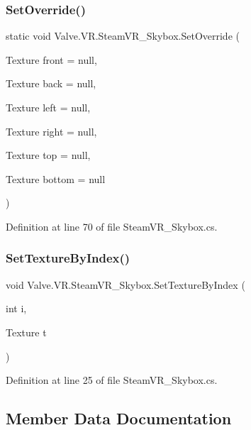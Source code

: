 \subsubsection{\texorpdfstring{SetOverride()}{SetOverride()}}
{\footnotesize\ttfamily static void Valve.\+V\+R.\+Steam\+V\+R\+\_\+\+Skybox.\+Set\+Override (\begin{DoxyParamCaption}\item[{Texture}]{front = {\ttfamily null},  }\item[{Texture}]{back = {\ttfamily null},  }\item[{Texture}]{left = {\ttfamily null},  }\item[{Texture}]{right = {\ttfamily null},  }\item[{Texture}]{top = {\ttfamily null},  }\item[{Texture}]{bottom = {\ttfamily null} }\end{DoxyParamCaption})\hspace{0.3cm}{\ttfamily [static]}}



Definition at line 70 of file Steam\+V\+R\+\_\+\+Skybox.\+cs.

\mbox{\label{class_valve_1_1_v_r_1_1_steam_v_r___skybox_a541669a701c468fbe370c06f5b7b553a}} 
\subsubsection{\texorpdfstring{SetTextureByIndex()}{SetTextureByIndex()}}
{\footnotesize\ttfamily void Valve.\+V\+R.\+Steam\+V\+R\+\_\+\+Skybox.\+Set\+Texture\+By\+Index (\begin{DoxyParamCaption}\item[{int}]{i,  }\item[{Texture}]{t }\end{DoxyParamCaption})}



Definition at line 25 of file Steam\+V\+R\+\_\+\+Skybox.\+cs.



\subsection{Member Data Documentation}
\mbox{\label{class_valve_1_1_v_r_1_1_steam_v_r___skybox_aca0f063275555a2eef7d3a13c9d2ca25}} 
